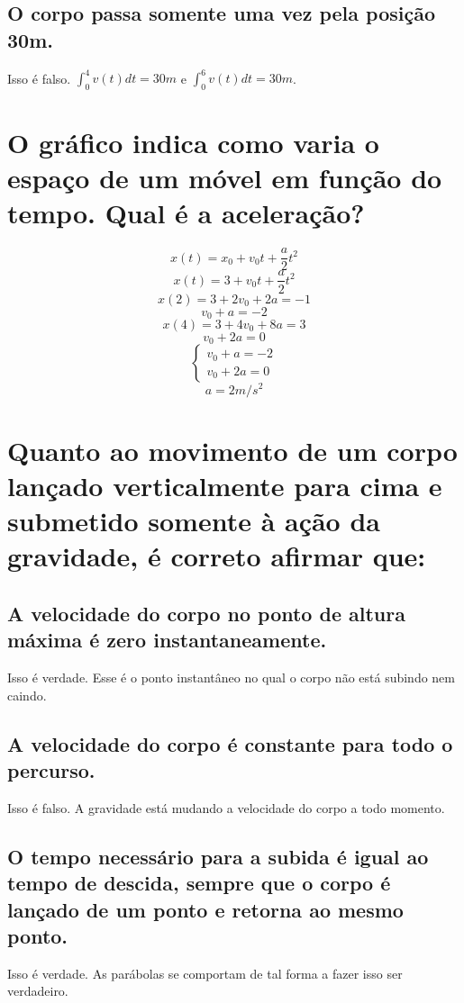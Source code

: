\documentclass{article}
\begin{document}
    \subsection{O corpo passa somente uma vez pela posição 30m.}
        \hspace{\parindent} Isso é falso. \(\int_0^4v(t)dt=30m\) e \(\int_0^6v(t)dt=30m\).

\section{O gráfico indica como varia o espaço de um móvel em função do tempo. Qual é a aceleração?}
    \[x(t)=x_0+v_0t+\frac{a}{2}t^2\]
    \[x(t)=3+v_0t+\frac{a}{2}t^2\]
    \[x(2)=3+2v_0+2a=-1\]
    \[v_0+a=-2\]
    \[x(4)=3+4v_0+8a=3\]
    \[v_0+2a=0\]
    $$ \left\{
        \begin{array}{lr}
            v_0+a=-2\\
            v_0+2a = 0
        \end{array}
    \right. $$
    \[a=2m/s^2\]

\section{Quanto ao movimento de um corpo lançado verticalmente para cima e submetido somente à ação da gravidade, é correto afirmar que:}
    \subsection{A velocidade do corpo no ponto de altura máxima é zero instantaneamente.}
    \hspace{\parindent}Isso é verdade. Esse é o ponto instantâneo no qual o corpo não está subindo nem caindo.
    \subsection{A velocidade do corpo é constante para todo o percurso.}
    \hspace{\parindent}Isso é falso. A gravidade está mudando a velocidade do corpo a todo momento.
    \subsection{O tempo necessário para a subida é igual ao tempo de descida, sempre que o corpo é lançado de um ponto e retorna ao mesmo ponto.}
    \hspace{\parindent}Isso é verdade. As parábolas se comportam de tal forma a fazer isso ser verdadeiro.
\end{document}
